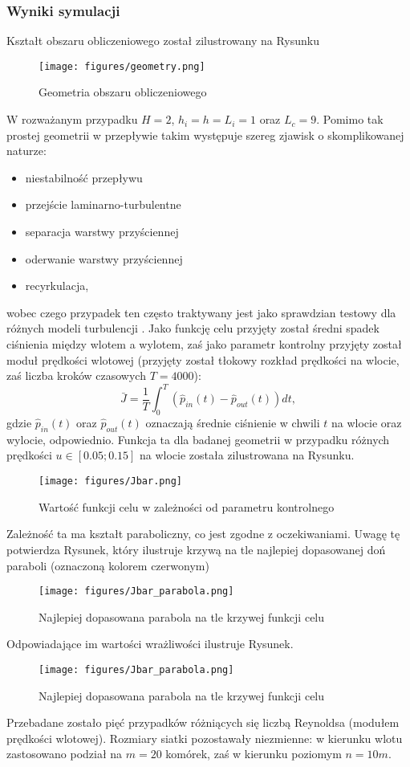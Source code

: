 \documentclass[12pt]{article}
\begin{document}
\subsubsection{Wyniki symulacji}
Kształt obszaru obliczeniowego został zilustrowany na Rysunku
\begin{figure}[H]
	\texttt{[image: figures/geometry.png]} 
	\centering
	\caption{Geometria obszaru obliczeniowego}
\end{figure}
W rozważanym przypadku $ H = 2 $, $ h_{i}=h=L_{i}=1 $ oraz $ L_{c}=9 $.\newline
Pomimo tak prostej geometrii w przepływie takim występuje szereg zjawisk o skomplikowanej naturze:
\begin{itemize}
	\item niestabilność przepływu
	\item przejście laminarno-turbulentne
	\item separacja warstwy przyściennej
	\item oderwanie warstwy przyściennej
	\item recyrkulacja,
\end{itemize}
wobec czego przypadek ten często traktywany jest jako sprawdzian testowy dla różnych modeli turbulencji \cite{Salazar}. \newline
Jako funkcję celu przyjęty został średni spadek ciśnienia między wlotem a wylotem, zaś jako parametr kontrolny przyjęty został moduł prędkości wlotowej (przyjęty został tłokowy rozkład prędkości na wlocie, zaś liczba kroków czasowych $ T = 4000 $):
\begin{equation}
\bar{J} = \frac{1}{T}\int_{0}^{T}(\hat{p}_{in}(t)-\hat{p}_{out}(t))dt,
\end{equation}
gdzie $ \hat{p}_{in}(t) $ oraz $ \hat{p}_{out}(t) $ oznaczają średnie ciśnienie w chwili $ t $ na wlocie oraz wylocie, odpowiednio. Funkcja ta dla badanej geometrii w przypadku różnych prędkości $ u \in [0.05 ; 0.15]$ na wlocie została zilustrowana na Rysunku.
\begin{figure}[H]
	\texttt{[image: figures/Jbar.png]} 
	\centering
	\caption{Wartość funkcji celu w zależności od parametru kontrolnego}
\end{figure}
Zależność ta ma kształt paraboliczny, co jest zgodne z oczekiwaniami. Uwagę tę potwierdza Rysunek, który ilustruje krzywą na tle najlepiej dopasowanej doń paraboli (oznaczoną kolorem czerwonym)
\begin{figure}[H]
	\texttt{[image: figures/Jbar\_parabola.png]} 
	\centering
	\caption{Najlepiej dopasowana parabola na tle krzywej funkcji celu}
\end{figure}
Odpowiadające im wartości wrażliwości ilustruje Rysunek.
\begin{figure}[H]
	\texttt{[image: figures/Jbar\_parabola.png]} 
	\centering
	\caption{Najlepiej dopasowana parabola na tle krzywej funkcji celu}
\end{figure}
Przebadane zostało pięć przypadków różniących się liczbą Reynoldsa (modułem prędkości wlotowej). Rozmiary siatki pozostawały niezmienne: w kierunku wlotu zastosowano podział na $ m=20 $ komórek, zaś w kierunku poziomym $ n=10m $.
\end{document}
